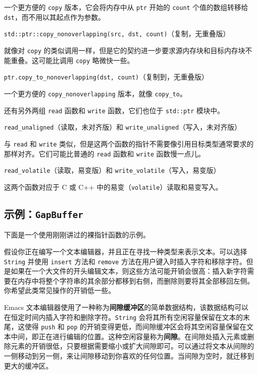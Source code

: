 一个更方便的 \texttt{copy} 版本，它会将内存中从 \texttt{ptr} 开始的 \texttt{count} 个值的数组转移给 \texttt{dst}，而不用以其起点作为参数。

\begin{myNote}
\texttt{std::ptr::copy\_nonoverlapping(src, dst, count)}（复制，无重叠版）
\end{myNote}

就像对 \texttt{copy} 的类似调用一样，但是它的契约进一步要求源内存块和目标内存块不能重叠。这可能比调用 \texttt{copy} 略微快一些。

\begin{myNote}
\texttt{ptr.copy\_to\_nonoverlapping(dst, count)}（复制到，无重叠版）
\end{myNote}

一个更方便的 \texttt{copy\_nonoverlapping} 版本，就像 \texttt{copy\_to}。

还有另外两组 \texttt{read} 函数和 \texttt{write} 函数，它们也位于 \texttt{std::ptr} 模块中。

\begin{myNote}
\texttt{read\_unaligned}（读取，未对齐版）和 \texttt{write\_unaligned}（写入，未对齐版）
\end{myNote}

与 \texttt{read} 和 \texttt{write} 类似，但是这两个函数的指针不需要像引用目标类型通常要求的那样对齐。它们可能比普通的 \texttt{read} 函数和 \texttt{write} 函数慢一点儿。

\begin{myNote}
\texttt{read\_volatile}（读取，易变版）和 \texttt{write\_volatile}（写入，易变版）
\end{myNote}

这两个函数对应于 C 或 C++ 中的易变（\texttt{volatile}）读取和易变写入。

\subsection{示例：\texttt{GapBuffer}}

下面是一个使用刚刚讲过的裸指针函数的示例。

假设你正在编写一个文本编辑器，并且正在寻找一种类型来表示文本。可以选择 \texttt{String} 并使用 \texttt{insert} 方法和 \texttt{remove} 方法在用户键入时插入字符和移除字符。但是如果在一个大文件的开头编辑文本，则这些方法可能开销会很高：插入新字符需要在内存中将整个字符串的其余部分都移到右侧，而删除则要将其全部移回左侧。你希望此类常见操作的开销低一些。

Emacs 文本编辑器使用了一种称为\textbf{间隙缓冲区}的简单数据结构，该数据结构可以在恒定时间内插入字符和删除字符。\texttt{String} 会将其所有空闲容量保留在文本的末尾，这使得 \texttt{push} 和 \texttt{pop} 的开销变得更低，而间隙缓冲区会将其空闲容量保留在文本中间，即正在进行编辑的位置。这种空闲容量称为\textbf{间隙}。在间隙处插入元素或删除元素的开销很低，只要根据需要缩小或扩大间隙即可。可以通过将文本从间隙的一侧移动到另一侧，来让间隙移动到你喜欢的任何位置。当间隙为空时，就迁移到更大的缓冲区。

